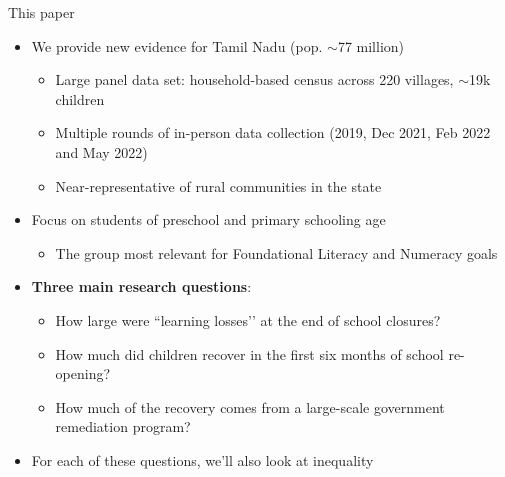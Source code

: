 \documentclass[aspectratio=169,numbering=none]{beamer}
\begin{document}
\begin{frame}[plain]{This paper}
\begin{itemize}
\vfill \item We provide new evidence for Tamil Nadu (pop. $\sim$77 million)
\begin{itemize}
\vfill\item Large panel data set: household-based census across 220 villages, $\sim$19k children
\vfill\item Multiple rounds of in-person data collection (2019, Dec 2021, Feb 2022 and May 2022)
\vfill\item Near-representative of rural communities in the state
\end{itemize}
\pause
\vfill \item Focus on students of preschool and primary schooling age
\begin{itemize}
\vfill\item The group most relevant for Foundational Literacy and Numeracy goals
\end{itemize}
\pause
\vfill \item \textbf{Three main research questions}:
\begin{itemize}
\vfill\item How large were ``learning losses’’ at the end of school closures?
\vfill\item How much did children recover in the first six months of school re-opening?
\vfill\item How much of the recovery comes from a large-scale government remediation program?

\end{itemize}
\vfill \item For each of these questions, we'll also look at inequality
\end{itemize}
\end{frame}
\end{document}
